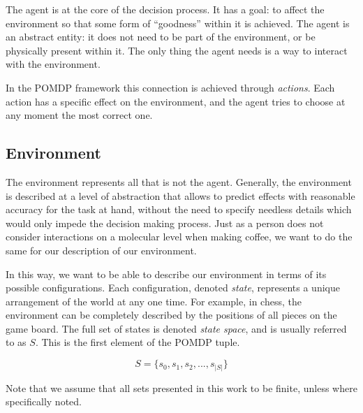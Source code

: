 The agent is at the core of the decision process. It has a goal: to affect the environment so that
some form of ``goodness'' within it is achieved. The agent is an abstract entity: it does not need
to be part of the environment, or be physically present within it. The only thing the agent needs is
a way to interact with the environment.


In the POMDP framework this connection is achieved through \textit{actions}. Each action has a
specific effect on the environment, and the agent tries to choose at any moment the most correct
one.

\subsection{Environment}

The environment represents all that is not the agent. Generally, the environment is described at a
level of abstraction that allows to predict effects with reasonable accuracy for the task at hand,
without the need to specify needless details which would only impede the decision making process.
Just as a person does not consider interactions on a molecular level when making coffee, we want to
do the same for our description of our environment.

In this way, we want to be able to describe our environment in terms of its possible configurations.
Each configuration, denoted \textit{state}, represents a unique arrangement of the world at any one
time. For example, in chess, the environment can be completely described by the positions of all
pieces on the game board. The full set of states is denoted \textit{state space}, and is usually
referred to as $S$. This is the first element of the POMDP tuple.

\[ S = \{s_0, s_1, s_2, ..., s_{|S|}\} \]

Note that we assume that all sets presented in this work to be finite, unless where specifically
noted.

